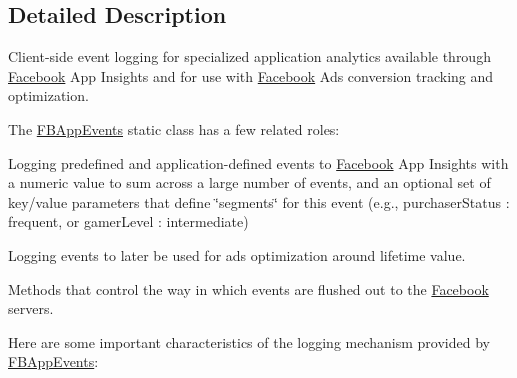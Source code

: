 \subsection{Detailed Description}
Client-\/side event logging for specialized application analytics available through \hyperlink{interfaceFacebook}{Facebook} App Insights and for use with \hyperlink{interfaceFacebook}{Facebook} Ads conversion tracking and optimization.

The {\ttfamily \hyperlink{interfaceFBAppEvents}{F\+B\+App\+Events}} static class has a few related roles\+:


\begin{DoxyItemize}
\item Logging predefined and application-\/defined events to \hyperlink{interfaceFacebook}{Facebook} App Insights with a numeric value to sum across a large number of events, and an optional set of key/value parameters that define \char`\"{}segments\char`\"{} for this event (e.\+g., \textquotesingle{}purchaser\+Status\textquotesingle{} \+: \textquotesingle{}frequent\textquotesingle{}, or \textquotesingle{}gamer\+Level\textquotesingle{} \+: \textquotesingle{}intermediate\textquotesingle{})
\item Logging events to later be used for ads optimization around lifetime value.
\item Methods that control the way in which events are flushed out to the \hyperlink{interfaceFacebook}{Facebook} servers.
\end{DoxyItemize}

Here are some important characteristics of the logging mechanism provided by {\ttfamily \hyperlink{interfaceFBAppEvents}{F\+B\+App\+Events}}\+:


